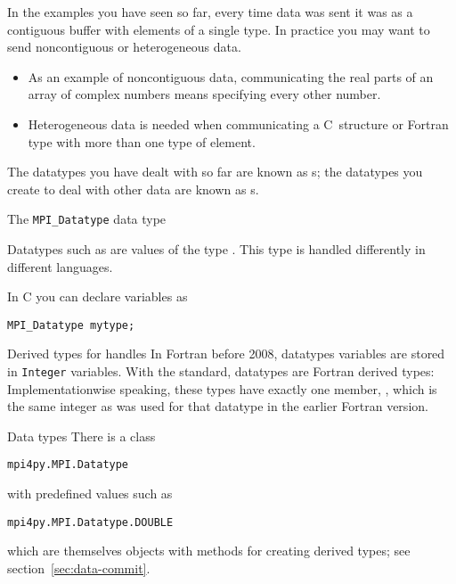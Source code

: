 

In the examples you have seen so far, every time data was sent
it was as a contiguous buffer with elements of a single type.
In practice you may want to send noncontiguous 
or heterogeneous data.
\begin{itemize}
\item As an example of noncontiguous data,
  communicating the real parts of an array of complex numbers
  means specifying every other number.
\item Heterogeneous data is needed when communicating a C~structure or Fortran type with more than one
  type of element.
\end{itemize}
The datatypes you have dealt with so far are known as
s;
the datatypes you create to deal with other data
are known as s.

 {The \texttt{MPI\_Datatype} data type}
\label{sec:mpi-datatype}

Datatypes such as  are values
of the type .
This type is handled differently in different languages.

In C you can declare variables as
\begin{lstlisting}
MPI_Datatype mytype;
\end{lstlisting}

\begin{fortrannote}{Derived types for handles}
  In Fortran before 2008, datatypes variables are stored in
  \lstinline{Integer} variables.
  With the  standard, datatypes are Fortran derived types:
  Implementationwise speaking, these types have exactly one member,
  , which is the same integer
  as was used for that datatype in the earlier Fortran version.
\end{fortrannote}

\begin{pythonnote}{Data types}
  There is a class
\begin{lstlisting}
mpi4py.MPI.Datatype
\end{lstlisting}
  with predefined values such as 
\begin{lstlisting}
mpi4py.MPI.Datatype.DOUBLE
\end{lstlisting}
  which are themselves objects with methods
  for creating derived types;
  see section~\ref{sec:data-commit}.
\end{pythonnote}

